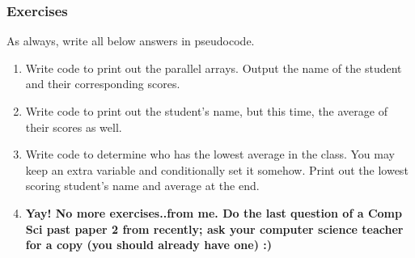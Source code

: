 \documentclass[./main.tex]{subfiles}
\begin{document}
\subsubsection{Exercises}
\label{ex:3_4_1}

As always, write all below answers in pseudocode.

\begin{enumerate}
    \item Write code to print out the parallel arrays. Output the name of the student and their corresponding scores.
        \verylargelines
    \item Write code to print out the student's name, but this time, the average of their scores as well.
        \verylargelines
    \item Write code to determine who has the lowest average in the class. You may keep an extra variable and conditionally set it somehow. Print out the lowest scoring student's name and average at the end.
        \verylargelines
    \item \textbf{Yay! No more exercises..from me. Do the last question of a Comp Sci past paper 2 from recently; ask your computer science teacher for a copy (you should already have one) :)}
\end{enumerate}
\end{document}
